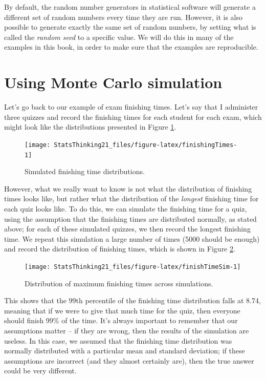 \documentclass[12pt,]{book}
\theoremstyle{definition}
\theoremstyle{definition}
\theoremstyle{definition}
\theoremstyle{remark}
\begin{document}
By default, the random number generators in statistical software will generate a different set of random numbers every time they are run. However, it is also possible to generate exactly the same set of random numbers, by setting what is called the \emph{random seed} to a specific value. We will do this in many of the examples in this book, in order to make sure that the examples are reproducible.

\hypertarget{using-monte-carlo-simulation}{%
\section{Using Monte Carlo simulation}\label{using-monte-carlo-simulation}}

Let's go back to our example of exam finishing times. Let's say that I administer three quizzes and record the finishing times for each student for each exam, which might look like the distributions presented in Figure \ref{fig:finishingTimes}.

\begin{figure}
\texttt{[image: StatsThinking21\_files/figure-latex/finishingTimes-1]} \caption{Simulated finishing time distributions.}\label{fig:finishingTimes}
\end{figure}

However, what we really want to know is not what the distribution of finishing times looks like, but rather what the distribution of the \emph{longest} finishing time for each quiz looks like. To do this, we can simulate the finishing time for a quiz, using the assumption that the finishing times are distributed normally, as stated above; for each of these simulated quizzes, we then record the longest finishing time. We repeat this simulation a large number of times (5000 should be enough) and record the distribution of finishing times, which is shown in Figure \ref{fig:finishTimeSim}.

\begin{figure}
\texttt{[image: StatsThinking21\_files/figure-latex/finishTimeSim-1]} \caption{Distribution of maximum finishing times across simulations.}\label{fig:finishTimeSim}
\end{figure}

This shows that the 99th percentile of the finishing time distribution falls at 8.74, meaning that if we were to give that much time for the quiz, then everyone should finish 99\% of the time. It's always important to remember that our assumptions matter -- if they are wrong, then the results of the simulation are useless. In this case, we assumed that the finishing time distribution was normally distributed with a particular mean and standard deviation; if these assumptions are incorrect (and they almost certainly are), then the true answer could be very different.
\end{document}
